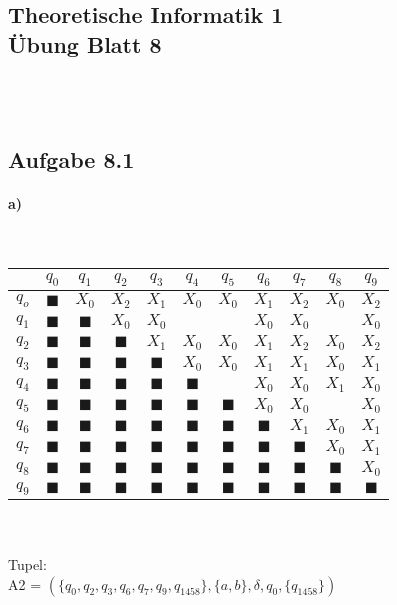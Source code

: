 \documentclass[11pt,a4paper]{article}
\begin{document}
\begin{center}
\section*{ Theoretische Informatik 1 \\ Übung Blatt 8}
\end{center}
\ \\ \ \\
\subsection*{Aufgabe 8.1}
\paragraph*{a)}\ \\
\begin{tabular}{c|c|c|c|c|c|c|c|c|c|c}
&$q_0$&$q_1$&$q_2$&$q_3$&$q_4$&$q_5$&$q_6$&$q_7$&$q_8$&$q_9$\\
\hline
$q_o$&$\blacksquare$&$X_0$&$X_2$&$X_1$&$X_0$&$X_0$&$X_1$&$X_2$&$X_0$&$X_2$\\
\hline
$q_1$&$\blacksquare$&$\blacksquare$&$X_0$&$X_0$&&&$X_0$&$X_0$&&$X_0$\\
\hline
$q_2$&$\blacksquare$&$\blacksquare$&$\blacksquare$&$X_1$&$X_0$&$X_0$&$X_1$&$X_2$&$X_0$&$X_2$\\
\hline
$q_3$&$\blacksquare$&$\blacksquare$&$\blacksquare$&$\blacksquare$&$X_0$&$X_0$&$X_1$&$X_1$&$X_0$&$X_1$\\
\hline
$q_4$&$\blacksquare$&$\blacksquare$&$\blacksquare$&$\blacksquare$&$\blacksquare$&&$X_0$&$X_0$&$X_1$&$X_0$\\
\hline
$q_5$&$\blacksquare$&$\blacksquare$&$\blacksquare$&$\blacksquare$&$\blacksquare$&$\blacksquare$&$X_0$&$X_0$&&$X_0$\\
\hline
$q_6$&$\blacksquare$&$\blacksquare$&$\blacksquare$&$\blacksquare$&$\blacksquare$&$\blacksquare$&$\blacksquare$&$X_1$&$X_0$&$X_1$\\
\hline
$q_7$&$\blacksquare$&$\blacksquare$&$\blacksquare$&$\blacksquare$&$\blacksquare$&$\blacksquare$&$\blacksquare$&$\blacksquare$&$X_0$&$X_1$\\
\hline
$q_8$&$\blacksquare$&$\blacksquare$&$\blacksquare$&$\blacksquare$&$\blacksquare$&$\blacksquare$&$\blacksquare$&$\blacksquare$&$\blacksquare$&$X_0$\\
\hline
$q_9$&$\blacksquare$&$\blacksquare$&$\blacksquare$&$\blacksquare$&$\blacksquare$&$\blacksquare$&$\blacksquare$&$\blacksquare$&$\blacksquare$&$\blacksquare$\\
\end{tabular}
\ \\
\ \\
Tupel:\\
A2 = $(\{q_0,q_2,q_3,q_6,q_7,q_9,q_{1458}\},\{a,b\},\delta,q_0,\{q_{1458}\})$
\end{document}
